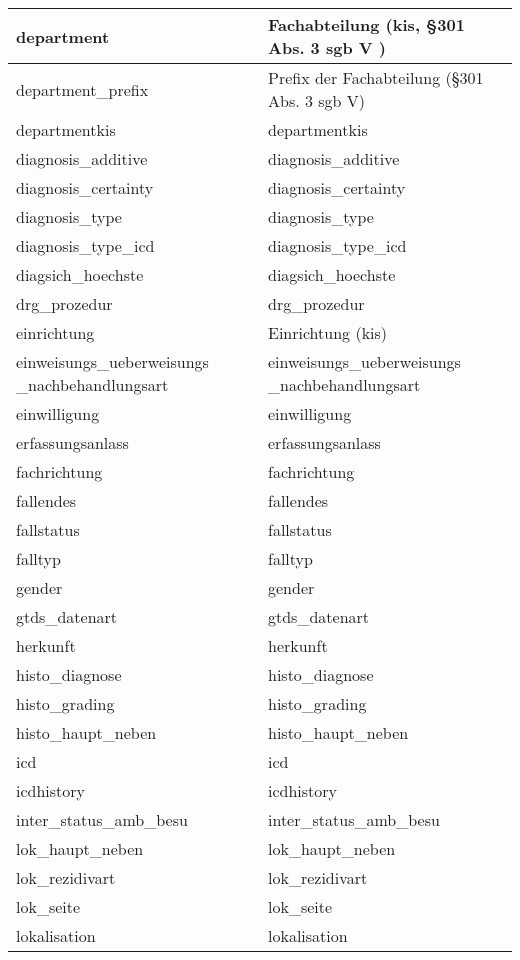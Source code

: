 \begin{longtable}{||p{6cm}|p{7.8cm}||}
  	department & Fachabteilung (\ac{kis}, \S 301 Abs. 3 \acs{sgb} V ) \\ \hline
  	department\_prefix & Prefix der Fachabteilung (\S 301 Abs. 3 \acs{sgb} V)\\ \hline
  	departmentkis & departmentkis\\ \hline
  	diagnosis\_additive & diagnosis\_additive\\ \hline
  	diagnosis\_certainty & diagnosis\_certainty\\ \hline
  	diagnosis\_type & diagnosis\_type\\ \hline
  	diagnosis\_type\_icd & diagnosis\_type\_icd\\ \hline
  	diagsich\_hoechste & diagsich\_hoechste\\ \hline
  	drg\_prozedur & drg\_prozedur\\ \hline
  	einrichtung & Einrichtung (\ac{kis})\\ \hline
  	einweisungs\_ueberweisungs \_nachbehandlungsart & einweisungs\_ueberweisungs \_nachbehandlungsart\\ \hline
  	einwilligung & einwilligung\\ \hline
  	erfassungsanlass & erfassungsanlass\\ \hline
  	fachrichtung & fachrichtung\\ \hline
  	fallendes & fallendes\\ \hline
  	fallstatus & fallstatus\\ \hline
  	falltyp & falltyp\\ \hline
  	gender & gender\\ \hline
  	gtds\_datenart & gtds\_datenart\\ \hline
  	herkunft & herkunft\\ \hline
  	histo\_diagnose & histo\_diagnose\\ \hline
  	histo\_grading & histo\_grading\\ \hline
  	histo\_haupt\_neben & histo\_haupt\_neben\\ \hline
  	icd & icd\\ \hline
  	icdhistory & icdhistory\\ \hline
  	inter\_status\_amb\_besu & inter\_status\_amb\_besu\\ \hline
  	lok\_haupt\_neben & lok\_haupt\_neben\\ \hline
  	lok\_rezidivart & lok\_rezidivart\\ \hline
  	lok\_seite & lok\_seite\\ \hline
  	lokalisation & lokalisation\\ \hline

\end{longtable}
